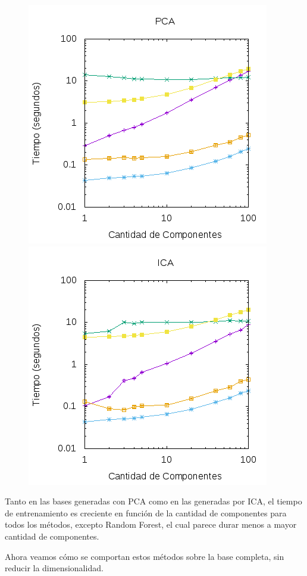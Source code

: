 \documentclass[10pt, a4paper]{article}
\begin{document}
\begin{figure}[H]
\centering
\includegraphics[scale=0.6]{../src/data/tmpca.png}
\includegraphics[scale=0.6]{../src/data/tmica.png}
\end{figure}

Tanto en las bases generadas con PCA como en las generadas por ICA, el tiempo de entrenamiento es creciente en función de la cantidad de componentes para todos los métodos, excepto Random Forest, el cual parece durar menos a mayor cantidad de componentes.

Ahora veamos cómo se comportan estos métodos sobre la base completa, sin reducir la dimensionalidad.
\end{document}
